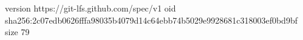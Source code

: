 version https://git-lfs.github.com/spec/v1
oid sha256:2c07edb0626fffa98035b4079d14c64ebb74b5029e9928681c318003ef0bd9bf
size 79
